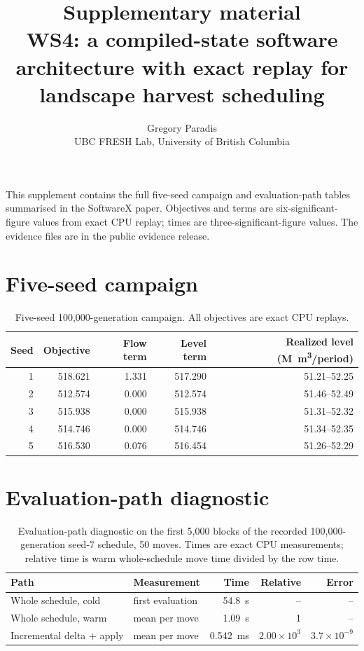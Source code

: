 \documentclass[10pt]{article}
\title{Supplementary material\\
\large WS4: a compiled-state software architecture with exact replay for landscape harvest scheduling}
\author{Gregory Paradis\\UBC FRESH Lab, University of British Columbia}
\date{}
\begin{document}
\renewcommand{\thetable}{S\arabic{table}}
\maketitle

\noindent
This supplement contains the full five-seed campaign and evaluation-path tables summarised in the
SoftwareX paper. Objectives and terms are six-significant-figure values from exact CPU replay; times
are three-significant-figure values. The evidence files are in the public evidence release.

\section{Five-seed campaign}

\begin{table}[h]
\centering
\caption{Five-seed 100,000-generation campaign. All objectives are exact CPU replays.}
\small
\begin{tabular}{rrrrr}
\toprule
Seed & Objective & Flow term & Level term & Realized level (M~m\textsuperscript{3}/period) \\
\midrule
1 & 518.621 & 1.331 & 517.290 & 51.21--52.25 \\
2 & 512.574 & 0.000 & 512.574 & 51.46--52.49 \\
3 & 515.938 & 0.000 & 515.938 & 51.31--52.32 \\
4 & 514.746 & 0.000 & 514.746 & 51.34--52.35 \\
5 & 516.530 & 0.076 & 516.454 & 51.26--52.29 \\
\bottomrule
\end{tabular}
\end{table}

\section{Evaluation-path diagnostic}

\begin{table}[h]
\centering
\caption{Evaluation-path diagnostic on the first 5,000 blocks of the recorded 100,000-generation
seed-7 schedule, 50 moves. Times are exact CPU measurements; relative time is warm whole-schedule move
time divided by the row time.}
\small
\begin{tabular}{@{}llrrr@{}}
\toprule
Path & Measurement & Time & Relative & Error \\
\midrule
Whole schedule, cold & first evaluation & 54.8~s & -- & -- \\
Whole schedule, warm & mean per move & 1.09~s & 1 & -- \\
Incremental delta + apply & mean per move & 0.542~ms & $2.00\times10^{3}$ & $3.7\times10^{-9}$ \\
\bottomrule
\end{tabular}
\end{table}
\end{document}
